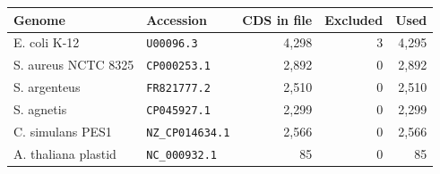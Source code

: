 \begin{tabular}{@{}l l r r r@{}}
\toprule
Genome & Accession & CDS in file & Excluded & Used \\
\midrule
E. coli K-12 & \texttt{U00096.3} & 4{,}298 & 3 & 4{,}295 \\
S. aureus NCTC 8325 & \texttt{CP000253.1} & 2{,}892 & 0 & 2{,}892 \\
S. argenteus & \texttt{FR821777.2} & 2{,}510 & 0 & 2{,}510 \\
S. agnetis & \texttt{CP045927.1} & 2{,}299 & 0 & 2{,}299 \\
C. simulans PES1 & \texttt{NZ\_CP014634.1} & 2{,}566 & 0 & 2{,}566 \\
A. thaliana plastid & \texttt{NC\_000932.1} & 85 & 0 & 85 \\
\bottomrule
\end{tabular}